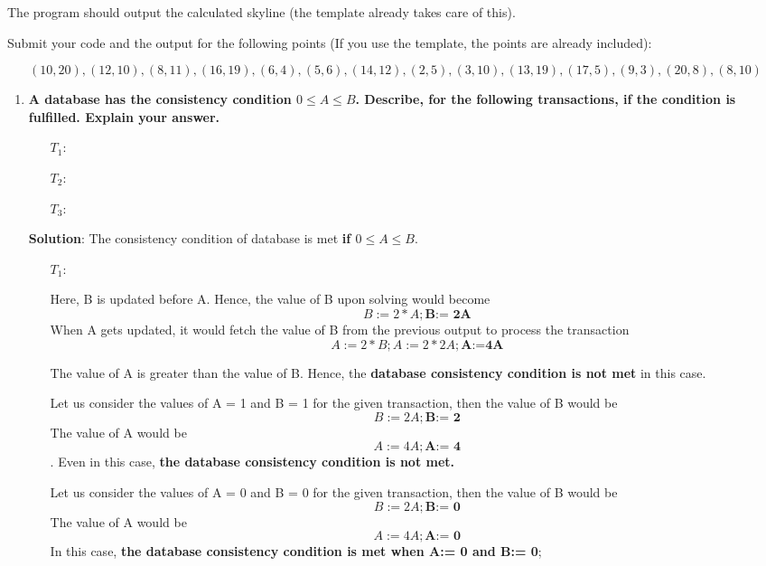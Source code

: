 The program should output the calculated skyline (the template already takes care of this).

Submit your code and the output for the following points (If you use the template, the points are already included):

$$(10,20),(12,10),(8,11),(16,19),(6,4),(5,6),(14,12),(2,5),(3,10),(13,19),(17,5),(9,3),(20,8),(8,10)$$

\newpage


\begin{enumerate}
	\item \textbf{A database has the consistency condition $0\leq A\leq B$. Describe, for the following transactions, if the condition is fulfilled. Explain your answer.}

    \begin{enumerate}

    \item[$T_1: $] 
    \item[$T_2: $] 
    \item[$T_3: $] 
    \end{enumerate}

\textbf{Solution}: The consistency condition of database is met \textbf{if $0\leq A\leq B$}. 

\begin{enumerate}

  \item[$T_1: $] 
  
  Here, B is updated before A. Hence, the value of B upon solving would become
  \[B:= 2*A ; \textbf{B:= 2A}\]
  When A gets updated, it would fetch the value of B from the previous output to process the transaction
  \[A:= 2*B ; A:= 2*2A ; \textbf{A:=4A}\]

  The value of A is greater than the value of B. Hence, the \textbf{\color{red} database consistency condition is not met} in this case.

  Let us consider the values of A = 1 and B = 1 for the given transaction, then the value of B would be  \[B:= 2A ; \textbf{B:= 2}\]
  The value of A would be \[A:=4A; \textbf{A:= 4}\]. Even in this case, \textbf{\color{red}the database consistency condition is not met.}

  Let us consider the values of A = 0 and B = 0 for the given transaction, then the value of B would be  \[B:= 2A ; \textbf{B:= 0}\] 
  The value of A would be \[A:=4A; \textbf{A:= 0}\] In this case, \textbf{\color{blue}the database consistency condition is met when A:= 0 and B:= 0};


\end{enumerate}
\end{enumerate}
